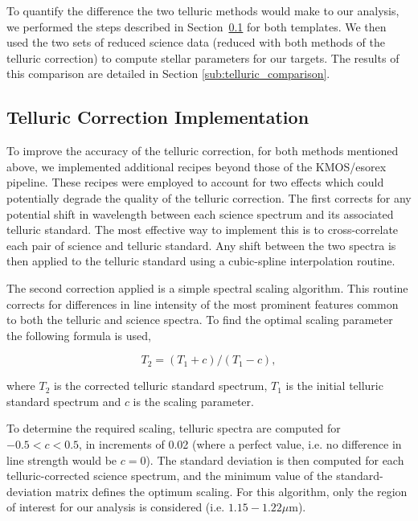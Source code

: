 \documentclass[iop]{emulateapj}
\begin{document}
To quantify the difference the two telluric methods would make to our analysis,
we performed the steps described in
Section~\ref{sub:ngc6822_telluric_correction} for both templates.
We then used the two sets of reduced science data
(reduced with both methods of the telluric correction) to compute stellar parameters for our targets.
The results of this comparison are detailed in Section
\ref{sub:telluric_comparison}.


\subsection{Telluric Correction Implementation} %
\label{sub:ngc6822_telluric_correction}

To improve the accuracy of the telluric correction,
for both methods mentioned above,
we implemented additional recipes beyond those of the KMOS/esorex pipeline.
These recipes were employed to account for two effects which could potentially degrade the quality of the telluric correction.
The first corrects for any potential shift in wavelength between each science spectrum and its associated telluric standard.
The most effective way to implement this is to cross-correlate each pair of science and telluric standard.
Any shift between the two spectra is then applied to the telluric standard using a cubic-spline interpolation routine.

The second correction applied is a simple spectral scaling algorithm.
This routine corrects for differences in line intensity of the most prominent features common to both the telluric and science spectra.
To find the optimal scaling parameter the following formula is used,

\begin{equation} \label{eq:shiftandres}
T_{2} = (T_{1} + c) / (T_{1} - c),
\end{equation}

\noindent where $T_{2}$ is the corrected telluric standard spectrum,
$T_{1}$ is the initial telluric standard spectrum and $c$ is the scaling parameter.

To determine the required scaling,
telluric spectra are computed for $-0.5 < c < 0.5$, in increments of 0.02
(where a perfect value, i.e. no difference in line strength would be $c = 0$).
The standard deviation is then computed for each telluric-corrected science spectrum, and the minimum value of the standard-deviation matrix defines the optimum scaling.
For this algorithm, only the region of interest for our analysis is considered (i.e. $1.15 - 1.22\mu$m).
\end{document}

